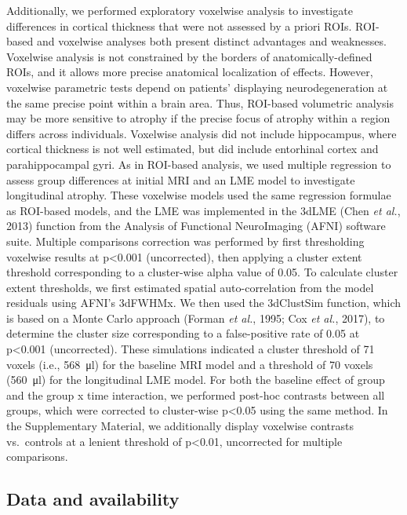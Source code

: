 \documentclass[]{article}
\begin{document}
Additionally, we performed exploratory voxelwise analysis to investigate
differences in cortical thickness that were not assessed by a priori
ROIs. ROI-based and voxelwise analyses both present distinct advantages
and weaknesses. Voxelwise analysis is not constrained by the borders of
anatomically-defined ROIs, and it allows more precise anatomical
localization of effects. However, voxelwise parametric tests depend on
patients' displaying neurodegeneration at the same precise point within
a brain area. Thus, ROI-based volumetric analysis may be more sensitive
to atrophy if the precise focus of atrophy within a region differs
across individuals. Voxelwise analysis did not include hippocampus,
where cortical thickness is not well estimated, but did include
entorhinal cortex and parahippocampal gyri. As in ROI-based analysis, we
used multiple regression to assess group differences at initial MRI and
an LME model to investigate longitudinal atrophy. These voxelwise models
used the same regression formulae as ROI-based models, and the LME was
implemented in the 3dLME (Chen \emph{et al.}, 2013) function from the
Analysis of Functional NeuroImaging (AFNI) software suite. Multiple
comparisons correction was performed by first thresholding voxelwise
results at p\textless{}0.001 (uncorrected), then applying a cluster
extent threshold corresponding to a cluster-wise alpha value of 0.05. To
calculate cluster extent thresholds, we first estimated spatial
auto-correlation from the model residuals using AFNI's 3dFWHMx. We then
used the 3dClustSim function, which is based on a Monte Carlo approach
(Forman \emph{et al.}, 1995; Cox \emph{et al.}, 2017), to determine the
cluster size corresponding to a false-positive rate of 0.05 at
p\textless{}0.001 (uncorrected). These simulations indicated a cluster
threshold of 71 voxels (i.e., \SI{568}{\micro\litre}) for the baseline
MRI model and a threshold of 70 voxels (\SI{560}{\micro\litre}) for the
longitudinal LME model. For both the baseline effect of group and the
group x time interaction, we performed post-hoc contrasts between all
groups, which were corrected to cluster-wise p\textless{}0.05 using the
same method. In the Supplementary Material, we additionally display
voxelwise contrasts vs.~controls at a lenient threshold of
p\textless{}0.01, uncorrected for multiple comparisons.

\subsection*{Data and availability}\label{data-and-availability}
\end{document}
